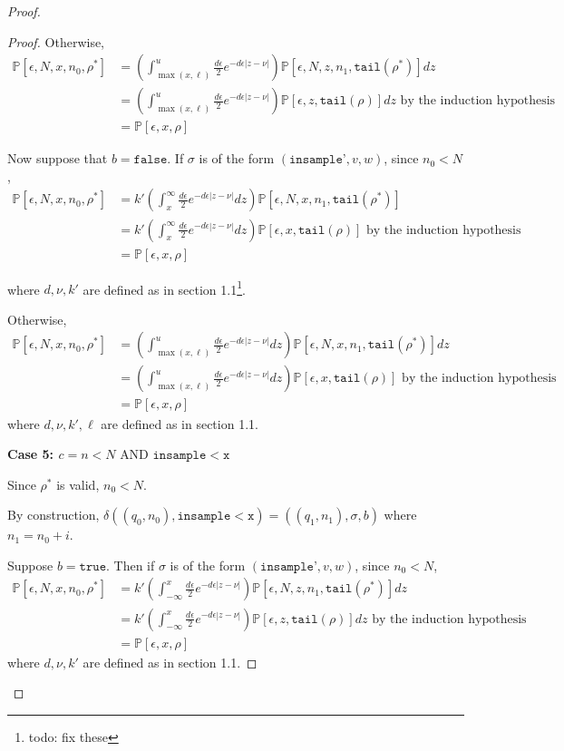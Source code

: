 \documentclass[12pt]{article}
\newcommand{\PP}{\mathbb{P}}
\newcommand{\lguard}{\texttt{insample} < \texttt{x}}
\newcommand{\laguard}{n<N\text{ AND }\texttt{insample} < \texttt{x}}
\theoremstyle{definition}
\begin{document}
\begin{proof}
\begin{proof}
	Otherwise, 
	\begin{align*}
		\PP[\epsilon, N, x, n_0, \rho^*] &= \left(\int_{\max(x, \ell)}^u\frac{d\epsilon}{2}e^{-d\epsilon|z-\nu|}\right)\PP[\epsilon, N, z, n_1, \texttt{tail}(\rho^*)]dz \\
		&= \left(\int_{\max(x, \ell)}^u\frac{d\epsilon}{2}e^{-d\epsilon|z-\nu|}\right)\PP[\epsilon, z, \texttt{tail}(\rho)]dz \text{ by the induction hypothesis }\\
		&= \PP[\epsilon, x, \rho]
	\end{align*}

	Now suppose that $b = \texttt{false}$. If $\sigma$ is of the form $(\texttt{insample'}, v, w)$, since $n_0 < N$, 
	\begin{align*}
		\PP[\epsilon, N, x, n_0, \rho^*] &= k'\left(\int_x^\infty\frac{d\epsilon}{2}e^{-d\epsilon|z-\nu|}dz\right)\PP[\epsilon, N, x, n_1, \texttt{tail}(\rho^*)]\\
		&= k'\left(\int_x^\infty\frac{d\epsilon}{2}e^{-d\epsilon|z-\nu|}dz\right)\PP[\epsilon, x, \texttt{tail}(\rho)] \text{ by the induction hypothesis }\\
		&= \PP[\epsilon, x, \rho]
	\end{align*}

	where $d, \nu, k'$ are defined as in section 1.1\footnote{todo: fix these}.

	Otherwise, 
	\begin{align*}
		\PP[\epsilon, N, x, n_0, \rho^*] &= \left(\int_{\max(x, \ell)}^u\frac{d\epsilon}{2}e^{-d\epsilon|z-\nu|}dz\right)\PP[\epsilon, N, x, n_1, \texttt{tail}(\rho^*)]dz \\
		&= \left(\int_{\max(x, \ell)}^u\frac{d\epsilon}{2}e^{-d\epsilon|z-\nu|}dz\right)\PP[\epsilon, x, \texttt{tail}(\rho)] \text{ by the induction hypothesis }\\
		&= \PP[\epsilon, x, \rho]
	\end{align*}
	where $d, \nu, k', \ell$ are defined as in section 1.1.

	\textbf{Case 5: $c = \laguard$}

	Since $\rho^*$ is valid, $n_0 < N$. 

	By construction, $\delta((q_0, n_0), \lguard) = ((q_1, n_1), \sigma, b)$ where $n_1 = n_0+i$. 

	Suppose $b = \texttt{true}$. Then if $\sigma$ is of the form $(\texttt{insample'}, v, w)$, since $n_0 < N$, 
		\begin{align*}
			\PP[\epsilon, N, x, n_0, \rho^*] &= k'\left(\int_{-\infty}^x\frac{d\epsilon}{2}e^{-d\epsilon|z-\nu|}\right)\PP[\epsilon, N, z, n_1, \texttt{tail}(\rho^*)]dz \\
			&= k'\left(\int_{-\infty}^x\frac{d\epsilon}{2}e^{-d\epsilon|z-\nu|}\right)\PP[\epsilon, z, \texttt{tail}(\rho)]dz \text{ by the induction hypothesis }\\
			&= \PP[\epsilon, x, \rho]
		\end{align*}
	where $d, \nu, k'$ are defined as in section 1.1.
	

\end{proof}
\end{proof}
\end{document}
